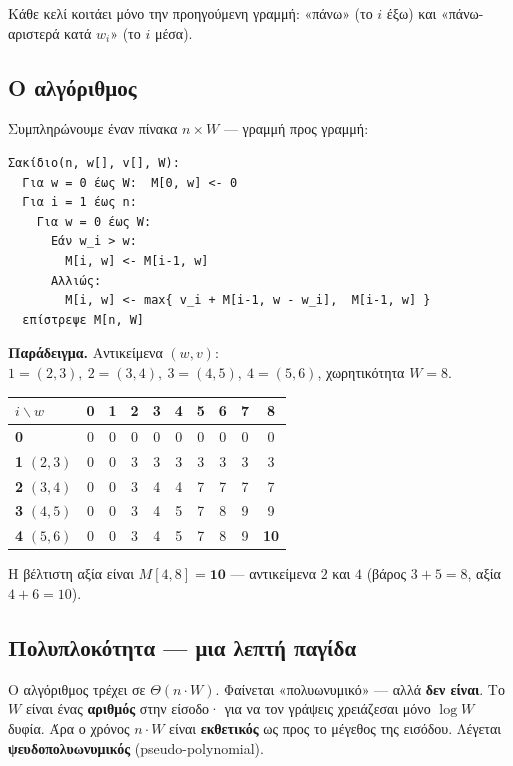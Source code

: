 \documentclass[11pt,a4paper]{article}
\begin{document}
Κάθε κελί κοιτάει μόνο την προηγούμενη γραμμή: «πάνω» (το $i$ έξω) και
«πάνω-αριστερά κατά $w_i$» (το $i$ μέσα).

\subsection{Ο αλγόριθμος}

Συμπληρώνουμε έναν πίνακα $n \times W$ --- γραμμή προς γραμμή:

\begin{codebox}
\begin{verbatim}
Σακίδιο(n, w[], v[], W):
  Για w = 0 έως W:  M[0, w] <- 0
  Για i = 1 έως n:
    Για w = 0 έως W:
      Εάν w_i > w:
        M[i, w] <- M[i-1, w]
      Αλλιώς:
        M[i, w] <- max{ v_i + M[i-1, w - w_i],  M[i-1, w] }
  επίστρεψε M[n, W]
\end{verbatim}
\end{codebox}

\textbf{Παράδειγμα.} Αντικείμενα $(w, v)$: $1 = (2,3),\ 2 = (3,4),\ 3 = (4,5),\
4 = (5,6)$, χωρητικότητα $W = 8$.

\begin{center}
\begin{tabular}{@{}l *{9}{c}@{}}
\toprule
$i \backslash w$ & 0 & 1 & 2 & 3 & 4 & 5 & 6 & 7 & 8 \\
\midrule
\textbf{0}            & 0 & 0 & 0 & 0 & 0 & 0 & 0 & 0 & 0 \\
\textbf{1} $(2,3)$    & 0 & 0 & 3 & 3 & 3 & 3 & 3 & 3 & 3 \\
\textbf{2} $(3,4)$    & 0 & 0 & 3 & 4 & 4 & 7 & 7 & 7 & 7 \\
\textbf{3} $(4,5)$    & 0 & 0 & 3 & 4 & 5 & 7 & 8 & 9 & 9 \\
\textbf{4} $(5,6)$    & 0 & 0 & 3 & 4 & 5 & 7 & 8 & 9 & \textbf{10} \\
\bottomrule
\end{tabular}
\end{center}

Η βέλτιστη αξία είναι $M[4, 8] = \mathbf{10}$ --- αντικείμενα $2$ και $4$ (βάρος
$3 + 5 = 8$, αξία $4 + 6 = 10$).

\subsection{Πολυπλοκότητα --- μια λεπτή παγίδα}

\begin{warningbox}
Ο αλγόριθμος τρέχει σε $\Theta(n \cdot W)$. Φαίνεται «πολυωνυμικό» --- αλλά
\textbf{δεν είναι}. Το $W$ είναι ένας \textbf{αριθμός} στην είσοδο· για να τον
γράψεις χρειάζεσαι μόνο $\log W$ δυφία. Άρα ο χρόνος $n \cdot W$ είναι
\textbf{εκθετικός} ως προς το μέγεθος της εισόδου. Λέγεται
\textbf{ψευδοπολυωνυμικός} (pseudo-polynomial).
\end{warningbox}
\end{document}
